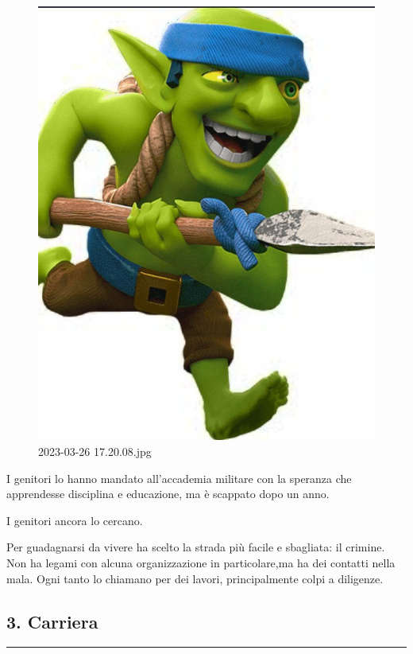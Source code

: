 \begin{figure}
\centering
\includegraphics{2023-03-26_17.20.08.jpg}
\caption{2023-03-26 17.20.08.jpg}
\end{figure}

I genitori lo hanno mandato all'accademia militare con la speranza che
apprendesse disciplina e educazione, ma è scappato dopo un anno.

I genitori ancora lo cercano.

Per guadagnarsi da vivere ha scelto la strada più facile e sbagliata: il
crimine. Non ha legami con alcuna organizzazione in particolare,ma ha
dei contatti nella mala. Ogni tanto lo chiamano per dei lavori,
principalmente colpi a diligenze.

\subsection{3. Carriera}\label{carriera}

\begin{center}\rule{0.5\linewidth}{0.5pt}\end{center}


